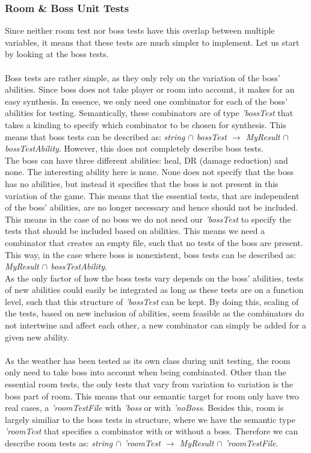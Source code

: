 \subsubsection{Room \& Boss Unit Tests}
Since neither room test nor boss tests have this overlap between multiple variables, it means that these tests are much simpler to implement. Let us start by looking at the boss tests. \\
\\
Boss tests are rather simple, as they only rely on the variation of the boss' abilities. Since boss does not take player or room into account, it makes for an easy synthesis. In essence, we only need one combinator for each of the boss' abilities for testing. Semantically, these combinators are of type \textit{'bossTest} that takes a kinding to specify which combinator to be chosen for synthesis. This means that boss tests can be described as: \textit{string $\cap$ bossTest $\to$ MyResult $\cap$ bossTestAbility}. However, this does not completely describe boss tests. \\
The boss can have three different abilities: heal, DR (damage reduction) and none. The interesting ability here is none. None does not specify that the boss has no abilities, but instead it specifies that the boss is not present in this variation of the game. This means that the essential tests, that are independent of the boss' abilities, are no longer necessary and hence should not be included. This means in the case of no boss we do not need our \textit{'bossTest} to specify the tests that should be included based on abilities. This means we need a combinator that creates an empty file, such that no tests of the boss are present. This way, in the case where boss is nonexistent, boss tests can be described as: \textit{MyResult $\cap$ bossTestAbility}. \\
As the only factor of how the boss tests vary depends on the boss' abilities, tests of new abilities could easily be integrated as long as these tests are on a function level, such that this structure of \textit{'bossTest} can be kept. By doing this, scaling of the tests, based on new inclusion of abilities, seem feasible as the combinators do not intertwine and affect each other, a new combinator can simply be added for a given new ability. %
\\ \\
As the weather has been tested as its own class during unit testing, the room only need to take boss into account when being combinated. Other than the essential room tests, the only tests that vary from variation to variation is the boss part of room. This means that our semantic target for room only have two real cases, a \textit{'roomTestFile} with \textit{'boss} or with \textit{'noBoss}. Besides this, room is largely similiar to the boss tests in structure, where we have the semantic type \textit{'roomTest} that specifies a combinator with or without a boss. Therefore we can describe room tests as: \textit{string $\cap$ 'roomTest $\to$ MyResult $\cap$ 'roomTestFile}. 